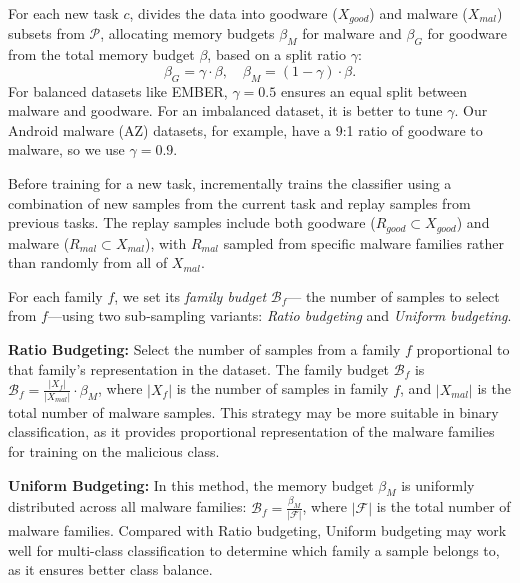 For each new task $c$, \system divides the data into goodware ($X_{good}$) and malware ($X_{mal}$) subsets from $\mathcal{P}$, allocating memory budgets $\beta_M$ for malware and $\beta_G$ for goodware from the total memory budget $\beta$, based on a split ratio $\gamma$:
\begin{equation}
    \beta_G = \gamma \cdot \beta, \quad  \beta_M = (1 - \gamma) \cdot \beta. %
\end{equation}
For balanced datasets like EMBER, $\gamma = 0.5$ ensures an equal split between malware and goodware. For an imbalanced dataset, it is better to tune $\gamma$. Our Android malware (AZ) datasets, for example, have a 9:1 ratio of goodware to malware, so we use $\gamma=0.9$.

Before training for a new task, \system incrementally trains the classifier using a combination of new samples from the current task and replay samples from previous tasks. The replay samples include both goodware ($R_{good} \subset X_{good}$) and malware ($R_{mal} \subset X_{mal}$), with $R_{mal}$ sampled from specific malware families rather than randomly from all of $X_{mal}$.

For each family $f$, we set its \emph{family budget} $\mathcal{B}_f$---
the number of samples to select from $f$---using two sub-sampling variants: \emph{Ratio budgeting} and \emph{Uniform budgeting}. 


\begin{smitemize}
    \item \textbf{Ratio Budgeting:} Select the number of samples from a family $f$ proportional to that family's representation in the dataset. The family budget $\mathcal{B}_f$ is
    $\mathcal{B}_f = \frac{|X_{f}|}{|X_{mal}|} \cdot \beta_M$,
    where $|X_{f}|$ is the number of samples in family $f$, and $|X_{mal}|$ is the total number of malware samples. This strategy may be more suitable in binary classification, as it provides proportional representation of the malware families for training on the malicious class.
    
    \item \textbf{Uniform Budgeting:} In this method, the memory budget $\beta_M$ is uniformly distributed across all malware families:
        $\mathcal{B}_f = \frac{\beta_M}{|\mathcal{F}|}$,
    where $|\mathcal{F}|$ is the total number of malware families. 
    Compared with Ratio budgeting, Uniform budgeting may work well for multi-class classification to determine which family a sample belongs to, as it ensures better class balance.
\end{smitemize}

